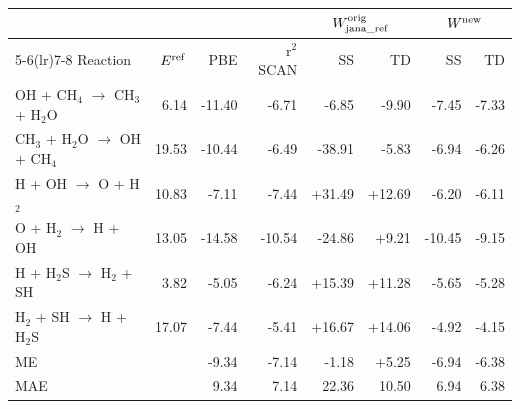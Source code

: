 \begin{tabular}{@{}l r rr rr rr@{}}
\toprule
 & & & & \multicolumn{2}{c}{$W^{\rm orig}_{\rm jana\_ref}$} & \multicolumn{2}{c}{$W^{\rm new}$} \\
\cmidrule(lr){5-6}\cmidrule(lr){7-8}
Reaction & $E^{\rm ref}$ & PBE & r$^2$SCAN & SS & TD & SS & TD \\
\midrule
OH + CH$_4$ $\to$ CH$_3$ + H$_2$O & 6.14 & \textcolor{pyscfred}{-11.40} & \textcolor{pyscfred}{-6.71} & \textcolor{pyscfred}{-6.85} & \textcolor{pyscfred}{-9.90} & \textcolor{pyscfred}{-7.45} & \textcolor{pyscfred}{-7.33} \\
CH$_3$ + H$_2$O $\to$ OH + CH$_4$ & 19.53 & \textcolor{pyscfred}{-10.44} & \textcolor{pyscfred}{-6.49} & \textcolor{pyscfred}{-38.91} & \textcolor{pyscfred}{-5.83} & \textcolor{pyscfred}{-6.94} & \textcolor{pyscfred}{-6.26} \\
H + OH $\to$ O + H$_2$ & 10.83 & \textcolor{pyscfred}{-7.11} & \textcolor{pyscfred}{-7.44} & \textcolor{pyscfred}{+31.49} & \textcolor{pyscfred}{+12.69} & \textcolor{pyscfred}{-6.20} & \textcolor{pyscfred}{-6.11} \\
O + H$_2$ $\to$ H + OH & 13.05 & \textcolor{pyscfred}{-14.58} & \textcolor{pyscfred}{-10.54} & \textcolor{pyscfred}{-24.86} & \textcolor{pyscfred}{+9.21} & \textcolor{pyscfred}{-10.45} & \textcolor{pyscfred}{-9.15} \\
H + H$_2$S $\to$ H$_2$ + SH & 3.82 & \textcolor{pyscfred}{-5.05} & \textcolor{pyscfred}{-6.24} & \textcolor{pyscfred}{+15.39} & \textcolor{pyscfred}{+11.28} & \textcolor{pyscfred}{-5.65} & \textcolor{pyscfred}{-5.28} \\
H$_2$ + SH $\to$ H + H$_2$S & 17.07 & \textcolor{pyscfred}{-7.44} & \textcolor{pyscfred}{-5.41} & \textcolor{pyscfred}{+16.67} & \textcolor{pyscfred}{+14.06} & \textcolor{pyscfred}{-4.92} & \textcolor{pyscfred}{-4.15} \\
\midrule
ME & & \textcolor{pyscfred}{-9.34} & \textcolor{pyscfred}{-7.14} & \textcolor{pyscfred}{-1.18} & \textcolor{pyscfred}{+5.25} & \textcolor{pyscfred}{-6.94} & \textcolor{pyscfred}{-6.38} \\
MAE & & \textcolor{pyscfred}{9.34} & \textcolor{pyscfred}{7.14} & \textcolor{pyscfred}{22.36} & \textcolor{pyscfred}{10.50} & \textcolor{pyscfred}{6.94} & \textcolor{pyscfred}{6.38} \\
\bottomrule
\end{tabular}
